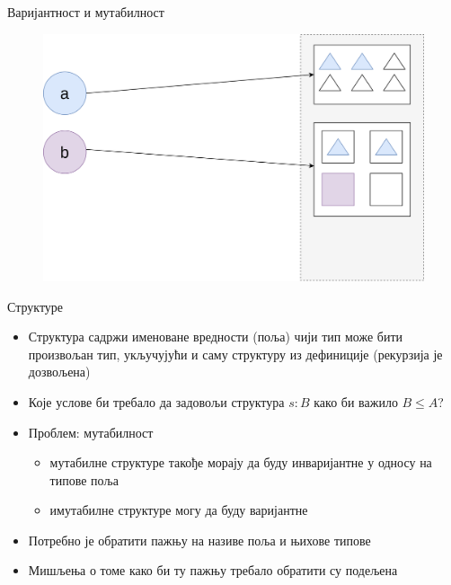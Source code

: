 \documentclass[xcolor=table]{beamer}
\begin{document}
\begin{frame}[allowframebreaks]{Варијантност и мутабилност}
        \begin{figure}
            \centering
            \includegraphics[height=0.7\textheight,keepaspectratio]{images/arr21.png}
        \end{figure}
    \end{frame}

    \begin{frame}{Структуре}
        \begin{itemize}
            \item Структура садржи именоване вредности (поља) чији тип може бити произвољан тип, укључујући и саму структуру из дефиниције (рекурзија је дозвољена)
            \item Које услове би требало да задовољи структура \begin{math}s: B\end{math} како би важило \begin{math}B \leq A\end{math}?
            \item Проблем: мутабилност
            \begin{itemize}
                \item мутабилне структуре такође морају да буду инваријантне у односу на типове поља
                \item имутабилне структуре могу да буду варијантне
            \end{itemize}
            \item Потребно је обратити пажњу на називе поља и њихове типове
            \item Мишљења о томе како би ту пажњу требало обратити су подељена
        \end{itemize}
    \end{frame}
\end{document}
